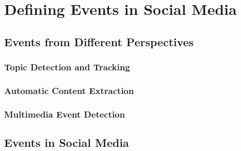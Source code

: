 
\chapter{Defining Events in Social Media} %

\label{events} %


\section{Events from Different Perspectives}

\subsection{Topic Detection and Tracking}

\subsection{Automatic Content Extraction}

\subsection{Multimedia Event Detection}

\section{Events in Social Media}